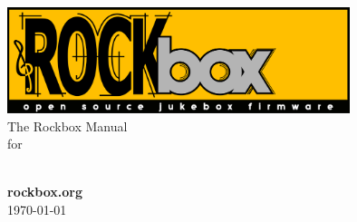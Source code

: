 \thispagestyle{empty}
\vspace*{0.3cm}
\begin{center}
\includegraphics[width=10cm]{frontpage/rockboxlogo3.pdf}\\
\vspace{2cm}
\huge{The Rockbox Manual\\for\\\playername}\vspace{1cm}\\

\vspace{\fill}

\large \textbf{rockbox.org}\ \\\today


\end{center}

\pagebreak
\thispagestyle{empty}
\cleardoublepage
